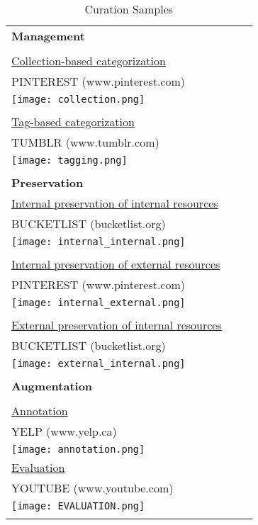 \begin{longtable}{|p{0.90\linewidth}|}
\caption{Curation Samples}\\
\hline

\textbf{Management} \\
\\
\underline{Collection-based categorization}     \\
PINTEREST (www.pinterest.com)\\
\texttt{[image: collection.png]}\\
\\
\underline{Tag-based categorization }         \\
TUMBLR (www.tumblr.com)\\
\texttt{[image: tagging.png]}\\

\\
\hline
\textbf{Preservation} \\
\underline{Internal preservation of internal resources}		\\
BUCKETLIST (bucketlist.org)\\
\texttt{[image: internal\_internal.png]}\\
\\
\hline
\pagebreak
\hline
\underline{Internal preservation of external resources}      \\
PINTEREST (www.pinterest.com)\\
\texttt{[image: internal\_external.png]}\\
\\
\underline{External preservation of internal resources}     \\
BUCKETLIST (bucketlist.org)\\
\texttt{[image: external\_internal.png]}\\
\\
\hline
\textbf{Augmentation} \\
\\
\underline{Annotation}  \\ 
YELP (www.yelp.ca)\\
\texttt{[image: annotation.png]}\\
\hline
\pagebreak
\hline
\underline{Evaluation} \\
YOUTUBE (www.youtube.com)\\
\texttt{[image: EVALUATION.png]}\\
 \\
\hline  
  

\end{longtable}
